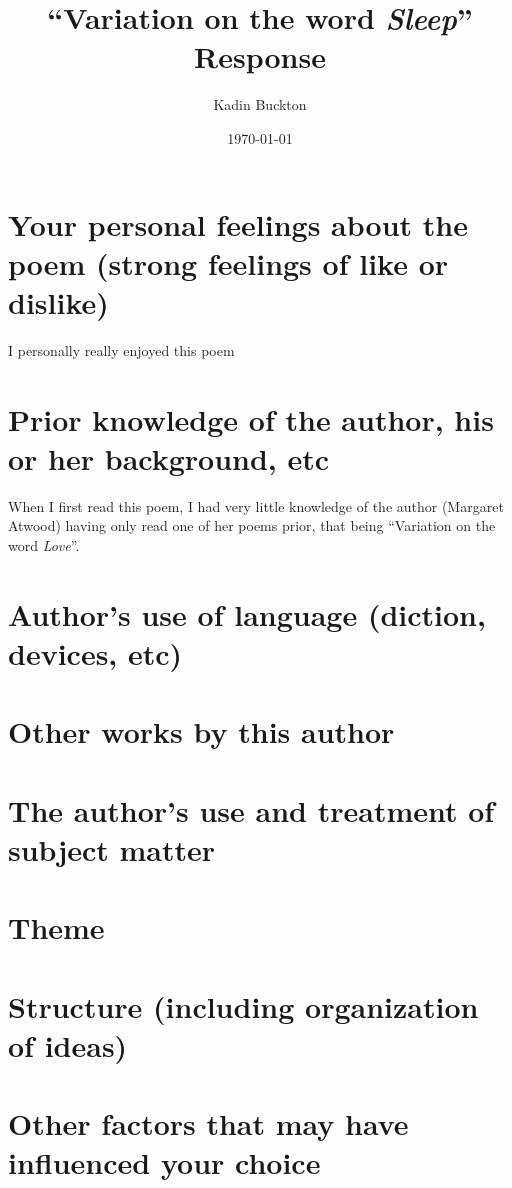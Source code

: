 \documentclass[11pt]{article}
\author{Kadin Buckton}
\date{\today}
\title{``Variation on the word \emph{Sleep}'' Response}
\begin{document}
\maketitle

\section*{Your personal feelings about the poem (strong feelings of like or dislike)}
\label{sec:org2324b5c}
I personally really enjoyed this poem

\section*{Prior knowledge of the author, his or her background, etc}
\label{sec:org6df7d9a}
When I first read this poem, I had very little knowledge of the author (Margaret Atwood) having only read one of her poems prior, that being ``Variation on the word \emph{Love}''.

\section*{Author's use of language (diction, devices, etc)}
\label{sec:orgb770ab9}

\section*{Other works by this author}
\label{sec:orgce52293}

\section*{The author's use and treatment of subject matter}
\label{sec:org4edaee9}

\section*{Theme}
\label{sec:orgab9bd22}

\section*{Structure (including organization of ideas)}
\label{sec:org3e68f3f}

\section*{Other factors that may have influenced your choice}
\label{sec:org39e1a22}
\end{document}
